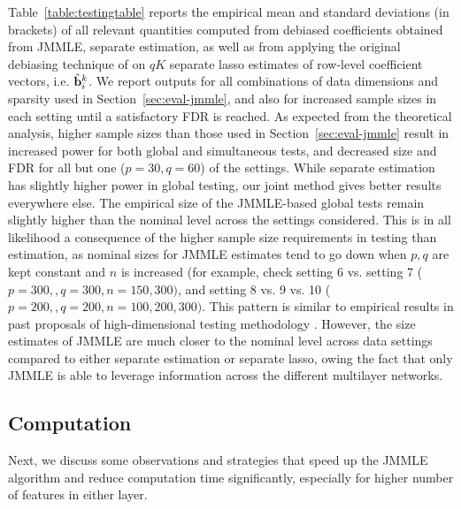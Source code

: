 Table~\ref{table:testingtable} reports the empirical mean and standard deviations (in brackets) of all relevant quantities computed from debiased coefficients obtained from JMMLE, separate estimation, as well as from applying the original debiasing technique of \citet{ZhangZhang14} on $qK$ separate lasso estimates of row-level coefficient vectors, i.e. $\hat {{\bf{b}}}_i^k$. We report outputs for all combinations of data dimensions and sparsity used in Section~\ref{sec:eval-jmmle}, and also for increased sample sizes in each setting until a satisfactory FDR is reached. As expected from the theoretical analysis, higher sample sizes than those used in Section~\ref{sec:eval-jmmle} result in increased power for both global and simultaneous tests, and decreased size and FDR for all but one ($p=30, q=60$) of the settings. While separate estimation has slightly higher power in global testing, our joint method gives better results everywhere else. The empirical size of the JMMLE-based global tests remain slightly higher than the nominal level across the settings considered. This is in all likelihood a consequence of the higher sample size requirements in testing than estimation, as nominal sizes for JMMLE estimates tend to go down when $p,q$ are kept constant and $n$ is increased (for example, check setting 6 vs. setting 7 ($p = 300, ,q = 300, n = 150, 300)$, and setting 8 vs. 9 vs. 10 ($p = 200, ,q = 200, n = 100,200,300)$. This pattern is similar to empirical results in past proposals of high-dimensional testing methodology \citep{ref:JASA151658_WangPengLi,aispu}. However, the size estimates of JMMLE are much closer to the nominal level across data settings compared to either separate estimation or separate lasso, owing the fact that only JMMLE is able to leverage information across the different multilayer networks.

\subsection{Computation}
\label{sec:tricks-jmmle}
Next, we discuss some observations and strategies that speed up the JMMLE algorithm and reduce computation time significantly, especially for higher number of features in either layer.

